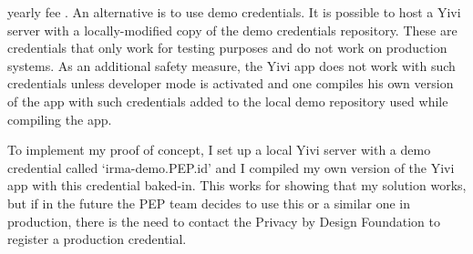 \documentclass{report}
\begin{document}
yearly fee \cite{irma-docs-issuer}. An alternative is to use demo credentials. It is possible to host a Yivi server with a locally-modified copy of the demo credentials
repository. These are credentials that only work for testing purposes and do not work on production systems. As an additional safety measure, the Yivi app does not work with such
credentials unless developer mode is activated and one compiles his own version of the app with such credentials added to the local demo repository used while compiling the app. \par 
To implement my proof of concept, I set up a local Yivi server with a demo credential called \enquote*{irma-demo.PEP.id} and I compiled my own version of the Yivi app with
this credential baked-in. This works for showing that my solution works, but if in the future the PEP team decides to use this or a similar one in production, there is the need to
contact the Privacy by Design Foundation to register a production credential.
\end{document}
